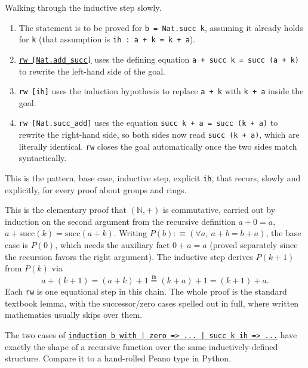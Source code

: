 Walking through the inductive step slowly.

\begin{enumerate}
\def\labelenumi{\arabic{enumi}.}
\tightlist
\item
  The statement is to be proved for \texttt{b = Nat.succ k}, assuming it already holds for \texttt{k} (that assumption is \texttt{ih : a + k = k + a}).
\item
  \href{https://lean-lang.org/doc/reference/latest/Tactic-Proofs/Tactic-Reference/}{\texttt{rw [Nat.add\_\allowbreak{}succ]}} uses the defining equation \texttt{a + succ k = succ (a + k)} to rewrite the left-hand side of the goal.
\item
  \texttt{rw [ih]} uses the induction hypothesis to replace \texttt{a + k} with \texttt{k + a} inside the goal.
\item
  \texttt{rw [Nat.succ\_\allowbreak{}add]} uses the equation \texttt{succ k + a = succ (k + a)} to rewrite the right-hand side, so both sides now read \texttt{succ (k + a)}, which are literally identical. \texttt{rw} closes the goal automatically once the two sides match syntactically.
\end{enumerate}

This is the pattern, base case, inductive step, explicit \texttt{ih}, that recurs, slowly and explicitly, for every proof about groups and rings.

\begin{mathreading}

This is the elementary proof that \((\mathbb{N}, +)\) is commutative, carried out by induction on the second argument from the recursive definition \(a + 0 = a\), \(a + \mathrm{succ}(k) = \mathrm{succ}(a + k)\). Writing \(P(b) :\equiv (\forall a,\ a + b = b + a)\), the base case is \(P(0)\), which needs the auxiliary fact \(0 + a = a\) (proved separately since the recursion favors the right argument). The inductive step derives \(P(k+1)\) from \(P(k)\) via \[
a + (k{+}1) = (a+k){+}1 \overset{\mathrm{ih}}{=} (k+a){+}1 = (k{+}1)+a.
\] Each \texttt{rw} is one equational step in this chain. The whole proof is the standard textbook lemma, with the successor/zero cases spelled out in full, where written mathematics usually skips over them.

\end{mathreading}

\begin{progcorner}

The two cases of \href{https://lean-lang.org/doc/reference/latest/Tactic-Proofs/Tactic-Reference/}{\texttt{induction b with | zero => ... | succ k ih => ...}} have exactly the shape of a recursive function over the same inductively-defined structure. Compare it to a hand-rolled Peano type in Python.

\end{progcorner}

